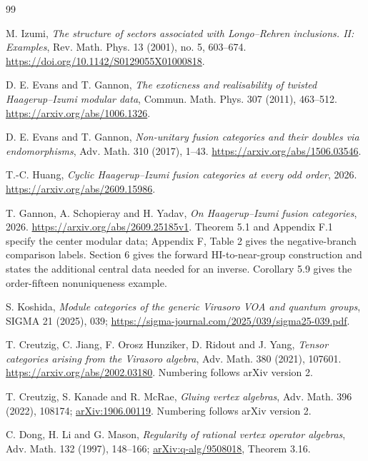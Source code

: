 \documentclass[11pt,a4paper]{article}
\numberwithin{equation}{section}
\theoremstyle{definition}\newtheorem{definition}[theorem]{Definition}
\theoremstyle{remark}\newtheorem{remark}[theorem]{Remark}
\begin{document}
{}
\begin{thebibliography}{99}
\small
\raggedright

M. Izumi,
\emph{The structure of sectors associated with Longo--Rehren inclusions.
II: Examples}, Rev. Math. Phys. 13 (2001), no. 5, 603--674.
\url{https://doi.org/10.1142/S0129055X01000818}.

D. E. Evans and T. Gannon,
\emph{The exoticness and realisability of twisted Haagerup--Izumi
modular data}, Commun. Math. Phys. 307 (2011), 463--512.
\url{https://arxiv.org/abs/1006.1326}.

D. E. Evans and T. Gannon,
\emph{Non-unitary fusion categories and their doubles via endomorphisms},
Adv. Math. 310 (2017), 1--43.
\url{https://arxiv.org/abs/1506.03546}.

T.-C. Huang,
\emph{Cyclic Haagerup--Izumi fusion categories at every odd order},
2026. \url{https://arxiv.org/abs/2609.15986}.

T. Gannon, A. Schopieray and H. Yadav,
\emph{On Haagerup--Izumi fusion categories}, 2026.
\url{https://arxiv.org/abs/2609.25185v1}.
Theorem 5.1 and Appendix F.1 specify the center modular data;
Appendix F, Table 2 gives the negative-branch comparison labels.
Section 6 gives the forward HI-to-near-group construction and
states the additional central data needed for an inverse.
Corollary 5.9 gives the order-fifteen nonuniqueness example.


S. Koshida, \emph{Module categories of the generic Virasoro VOA and quantum groups}, SIGMA 21 (2025), 039; \url{https://sigma-journal.com/2025/039/sigma25-039.pdf}.


T. Creutzig, C. Jiang, F. Orosz Hunziker,
D. Ridout and J. Yang,
\emph{Tensor categories arising from the Virasoro algebra},
Adv. Math. 380 (2021), 107601.
\url{https://arxiv.org/abs/2002.03180}.
Numbering follows arXiv version 2.


T. Creutzig, S. Kanade and R. McRae, \emph{Gluing vertex algebras}, Adv. Math. 396 (2022), 108174; \href{https://arxiv.org/abs/1906.00119}{arXiv:1906.00119}. Numbering follows arXiv version 2.


C. Dong, H. Li and G. Mason, \emph{Regularity of rational vertex operator algebras}, Adv. Math. 132 (1997), 148--166; \href{https://arxiv.org/abs/q-alg/9508018}{arXiv:q-alg/9508018}, Theorem 3.16.



\end{thebibliography}
\end{document}
